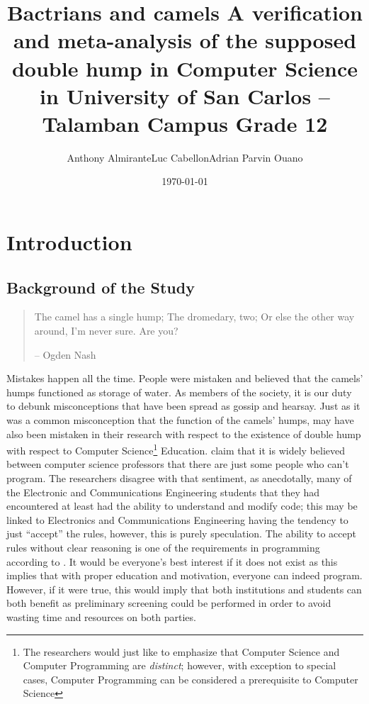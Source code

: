 \documentclass[12pt]{article}
\author{Anthony Almirante\nl{}Luc Cabellon\nl{}Adrian Parvin Ouano}
\date{\today}
\title{Bactrians and camels A verification and meta-analysis of the supposed double hump in Computer Science in University of San Carlos -- Talamban Campus Grade 12}
\begin{document}
\maketitle
\tableofcontents

\clearpage
\pagestyle{fancy}
\section{Introduction}
\label{sec:org312d646}
\subsection{Background of the Study}
\label{sec:org58a4495}
\begin{quote}
The camel has a single hump; The dromedary, two; Or else the other way
around, I'm never sure. Are you?

-- Ogden Nash
\end{quote}

Mistakes happen all the time. 
People were mistaken and believed that the camels' humps functioned as storage of water. 
As members of the society, it is our duty to debunk misconceptions 
that have been spread as gossip and hearsay.
Just as it was a common misconception that the function of the camels' humps,
\cite{dehnadi2006camel} may have also been mistaken in their research
with respect to the existence of double hump with respect to Computer Science\footnote{The researchers would just like to emphasize that Computer Science and Computer Programming are \emph{distinct}; 
however, with exception to special cases, Computer Programming can be considered a prerequisite to Computer Science} 
Education. 
\citep{bornat2014camels,bornat2008mental} claim that 
it is widely believed between computer science professors that 
there are just some people who can't program.
The researchers disagree with that sentiment, as anecdotally, 
many of the Electronic and Communications Engineering students that they had encountered 
at least had the ability to understand and modify code; 
this may be linked to Electronics and Communications Engineering having the tendency to just ``accept'' the rules, 
however, this is purely speculation. 
The ability to accept rules without clear reasoning is
one of the requirements in programming according to \cite{dehnadi2006camel}.
It would be everyone's best interest if it does not exist as 
this implies that with proper education and motivation, 
everyone can indeed program. 
However, if it were true, this would imply that both \glspl{institution} and students 
can both benefit as preliminary screening could be performed 
in order to avoid wasting time and resources on both parties.
\end{document}
